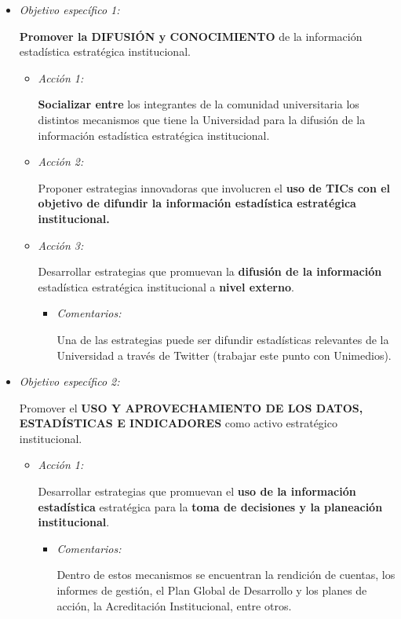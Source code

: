 \documentclass[
]{book}
\begin{document}
\begin{itemize}
\item
  \emph{Objetivo específico 1:}

  \textbf{Promover la DIFUSIÓN y CONOCIMIENTO} de la información estadística estratégica institucional.

  \begin{itemize}
  \item
    \emph{Acción 1:}

    \textbf{Socializar entre} los integrantes de la comunidad universitaria los distintos mecanismos que tiene la Universidad para la difusión de la información estadística estratégica institucional.
  \item
    \emph{Acción 2:}

    Proponer estrategias innovadoras que involucren el \textbf{uso de TICs con el objetivo de difundir la información estadística estratégica institucional.}
  \item
    \emph{Acción 3:}

    Desarrollar estrategias que promuevan la \textbf{difusión de la información} estadística estratégica institucional a \textbf{nivel externo}.

    \begin{itemize}
    \item
      \emph{Comentarios:}

      Una de las estrategias puede ser difundir estadísticas relevantes de la Universidad a través de Twitter (trabajar este punto con Unimedios).
    \end{itemize}
  \end{itemize}
\item
  \emph{Objetivo específico 2:}

  Promover el \textbf{USO Y APROVECHAMIENTO DE LOS DATOS, ESTADÍSTICAS E INDICADORES} como activo estratégico institucional.

  \begin{itemize}
  \item
    \emph{Acción 1:}

    Desarrollar estrategias que promuevan el \textbf{uso de la información estadística} estratégica para la \textbf{toma de decisiones y la planeación institucional}.

    \begin{itemize}
    \item
      \emph{Comentarios:}

      Dentro de estos mecanismos se encuentran la rendición de cuentas, los informes de gestión, el Plan Global de Desarrollo y los planes de acción, la Acreditación Institucional, entre otros.


\end{itemize}
\end{itemize}
\end{itemize}
\end{document}
